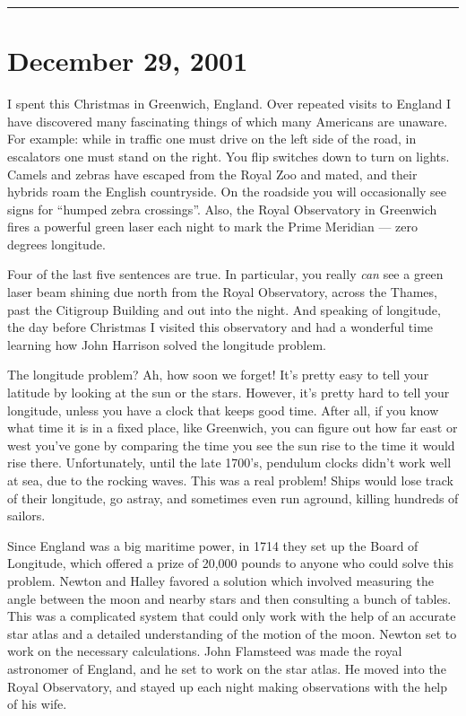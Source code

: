 \documentclass{article}
\begin{document}
\begin{center}\rule{0.5\linewidth}{0.5pt}\end{center}



\hypertarget{week175}{%
\section{December 29, 2001}\label{week175}}

I spent this Christmas in Greenwich, England. Over repeated visits to
England I have discovered many fascinating things of which many
Americans are unaware. For example: while in traffic one must drive on
the left side of the road, in escalators one must stand on the right.
You flip switches down to turn on lights. Camels and zebras have escaped
from the Royal Zoo and mated, and their hybrids roam the English
countryside. On the roadside you will occasionally see signs for
``humped zebra crossings''. Also, the Royal Observatory in Greenwich
fires a powerful green laser each night to mark the Prime Meridian ---
zero degrees longitude.

Four of the last five sentences are true. In particular, you really
\emph{can} see a green laser beam shining due north from the Royal
Observatory, across the Thames, past the Citigroup Building and out into
the night. And speaking of longitude, the day before Christmas I visited
this observatory and had a wonderful time learning how John Harrison
solved the longitude problem.

The longitude problem? Ah, how soon we forget! It's pretty easy to tell
your latitude by looking at the sun or the stars. However, it's pretty
hard to tell your longitude, unless you have a clock that keeps good
time. After all, if you know what time it is in a fixed place, like
Greenwich, you can figure out how far east or west you've gone by
comparing the time you see the sun rise to the time it would rise there.
Unfortunately, until the late 1700's, pendulum clocks didn't work well
at sea, due to the rocking waves. This was a real problem! Ships would
lose track of their longitude, go astray, and sometimes even run
aground, killing hundreds of sailors.

Since England was a big maritime power, in 1714 they set up the Board of
Longitude, which offered a prize of 20,000 pounds to anyone who could
solve this problem. Newton and Halley favored a solution which involved
measuring the angle between the moon and nearby stars and then
consulting a bunch of tables. This was a complicated system that could
only work with the help of an accurate star atlas and a detailed
understanding of the motion of the moon. Newton set to work on the
necessary calculations. John Flamsteed was made the royal astronomer of
England, and he set to work on the star atlas. He moved into the Royal
Observatory, and stayed up each night making observations with the help
of his wife.
\end{document}
